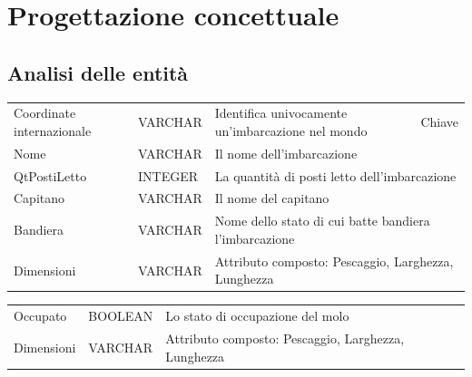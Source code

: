 \section{Progettazione concettuale}

\subsection{Analisi delle entità}

\begin{center}
    \begin{tabularx}{\textwidth}{|l|l|l|X|}
        \hline
        \rowcolor{gray!30}
        \multicolumn{4}{|c|}{\textbf{Imbarcazione}}\\
        \hline
        Coordinate internazionale & VARCHAR & Identifica univocamente un'imbarcazione nel mondo & Chiave \\
        \hline
        Nome & VARCHAR & \multicolumn{2}{l|}{Il nome dell'imbarcazione} \\
        \hline
        QtPostiLetto & INTEGER & \multicolumn{2}{l|}{La quantità di posti letto dell'imbarcazione} \\
        \hline
        Capitano & VARCHAR & \multicolumn{2}{l|}{Il nome del capitano} \\
        \hline
        Bandiera & VARCHAR & \multicolumn{2}{l|}{Nome dello stato di cui batte bandiera l'imbarcazione} \\
        \hline
        Dimensioni & VARCHAR & \multicolumn{2}{l|}{Attributo composto: Pescaggio, Larghezza, Lunghezza} \\
        \hline
    \end{tabularx}
\end{center}

\begin{center}
    \begin{tabularx}{\textwidth}{|l|l|X|}
        \hline
        \rowcolor{gray!30}
        \multicolumn{3}{|c|}{\textbf{Molo}}\\
        \hline
        Occupato & BOOLEAN & Lo stato di occupazione del molo\\
        \hline
        Dimensioni & VARCHAR & Attributo composto: Pescaggio, Larghezza, Lunghezza \\
        \hline
    \end{tabularx}
\end{center}

